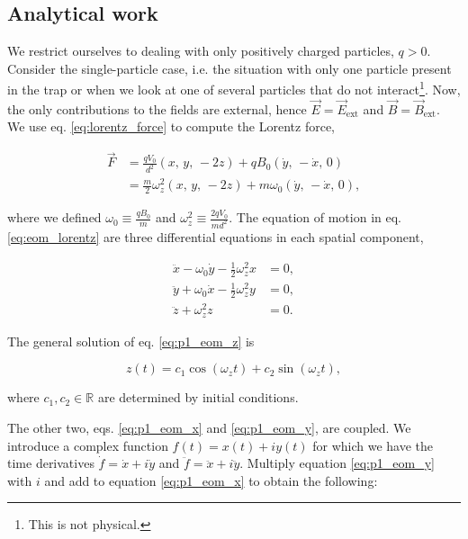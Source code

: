 \subsection{ Analytical work}

We restrict ourselves to dealing with only positively charged particles, $q>0$. Consider the single-particle case, i.e. the situation with only one particle present in the trap or when we look at one of several particles that do not interact\footnote{This is not physical.}. Now, the only contributions to the fields are external, hence $\vec{E} = \vec{E}_\mathrm{ext}$ and $\vec{B} = \vec{B}_\mathrm{ext}$. We use eq. \eqref{eq:lorentz_force} to compute the Lorentz force,


\begin{align}
    \vec{F} &= \frac{q V_0}{d^2}(x,\,y,\,-2z) + q B_0 (\dot{y},\,-\dot{x},\,0) \nonumber\\
    &= \frac{m}{2}\omega_z^2 (x,\,y,\,-2z) + m \omega_0 (\dot{y},\,-\dot{x},\,0),\label{eq:p1_lorentz_force_penning}
\end{align}

where we defined $\omega_0 \equiv \frac{qB_0}{m}$ and $\omega_z^2 \equiv \frac{2qV_0}{m d^2}$. The equation of motion in eq. \eqref{eq:eom_lorentz} are three differential equations in each spatial component,

\begin{subequations}\label{eq:p1_eom_xyz}
    \begin{align}
        \ddot{x} - \omega_0 \dot{y} - \frac{1}{2} \omega_z^2 x &= 0, \label{eq:p1_eom_x} \\ 
        \ddot{y} + \omega_0 \dot{x} - \frac{1}{2} \omega_z^2 y &= 0, \label{eq:p1_eom_y} \\ 
        \ddot{z} + \omega_z^2 z &= 0. \label{eq:p1_eom_z}
    \end{align}
\end{subequations}


The general solution of eq. \eqref{eq:p1_eom_z} is

\begin{equation}
    z(t) = c_1 \cos(\omega_z t) + c_2 \sin(\omega_z t), \label{eq:p1_diffeq_solution_z}
\end{equation}

where $c_1, c_2 \in \mathbb{R}$ are determined by initial conditions.

The other two, eqs. \eqref{eq:p1_eom_x} and \eqref{eq:p1_eom_y}, are coupled. We introduce a complex function $f(t)=x(t) + iy(t)$ for which we have the time derivatives $\dot{f} = \dot{x} + i\dot{y}$ and $\ddot{f} = \ddot{x} + i\ddot{y}$. Multiply equation \eqref{eq:p1_eom_y} with $i$ and add to equation \eqref{eq:p1_eom_x} to obtain the following:

